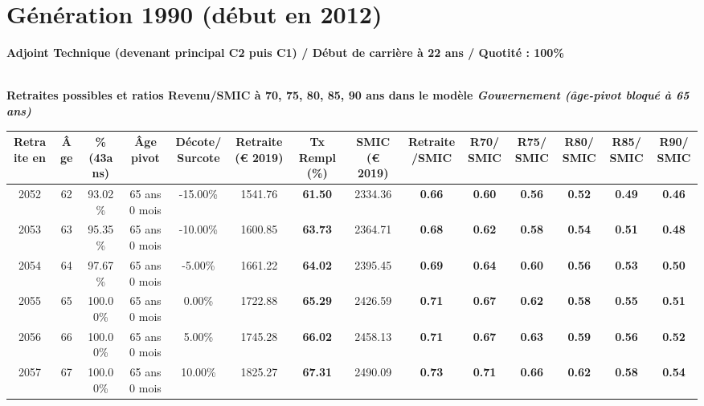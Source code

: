 \newpage 
 
\section{Génération 1990 (début en 2012)\label{AdjTech_100_22_1990_0}} 
 
{\bf \noindent Adjoint Technique (devenant principal C2 puis C1) / Début de carrière à 22 ans / Quotité : 100\%}  ~ 

 ~\\{\bf \noindent Retraites possibles et ratios Revenu/SMIC à 70, 75, 80, 85, 90 ans dans le modèle \emph{Gouvernement (âge-pivot bloqué à 65 ans)}}  
 
\begin{adjustbox}{max width=\textwidth} 
\begin{tabular}[htb]{|c|c||c|c|c||c|c||c|c||c|c|c|c|c|} 
\hline 
 Retraite en &  Âge &  \%(43ans) &  Âge pivot &  Décote/Surcote &  Retraite (\euro{} 2019) &  Tx Rempl(\%) &  SMIC (\euro{} 2019) &  Retraite/SMIC &  R70/SMIC &  R75/SMIC &  R80/SMIC &  R85/SMIC &  R90/SMIC \\ 
\hline \hline 
 2052 &  62 &  93.02\% &  65 ans 0 mois &  -15.00\% &  1541.76 &  {\bf 61.50} &  2334.36 &  {\bf {\color{red} 0.66}} &  {\bf {\color{red} 0.60}} &  {\bf {\color{red} 0.56}} &  {\bf {\color{red} 0.52}} &  {\bf {\color{red} 0.49}} &  {\bf {\color{red} 0.46}} \\ 
\hline 
 2053 &  63 &  95.35\% &  65 ans 0 mois &  -10.00\% &  1600.85 &  {\bf 63.73} &  2364.71 &  {\bf {\color{red} 0.68}} &  {\bf {\color{red} 0.62}} &  {\bf {\color{red} 0.58}} &  {\bf {\color{red} 0.54}} &  {\bf {\color{red} 0.51}} &  {\bf {\color{red} 0.48}} \\ 
\hline 
 2054 &  64 &  97.67\% &  65 ans 0 mois &  -5.00\% &  1661.22 &  {\bf 64.02} &  2395.45 &  {\bf {\color{red} 0.69}} &  {\bf {\color{red} 0.64}} &  {\bf {\color{red} 0.60}} &  {\bf {\color{red} 0.56}} &  {\bf {\color{red} 0.53}} &  {\bf {\color{red} 0.50}} \\ 
\hline 
 2055 &  65 &  100.00\% &  65 ans 0 mois &  0.00\% &  1722.88 &  {\bf 65.29} &  2426.59 &  {\bf {\color{red} 0.71}} &  {\bf {\color{red} 0.67}} &  {\bf {\color{red} 0.62}} &  {\bf {\color{red} 0.58}} &  {\bf {\color{red} 0.55}} &  {\bf {\color{red} 0.51}} \\ 
\hline 
 2056 &  66 &  100.00\% &  65 ans 0 mois &  5.00\% &  1745.28 &  {\bf 66.02} &  2458.13 &  {\bf {\color{red} 0.71}} &  {\bf {\color{red} 0.67}} &  {\bf {\color{red} 0.63}} &  {\bf {\color{red} 0.59}} &  {\bf {\color{red} 0.56}} &  {\bf {\color{red} 0.52}} \\ 
\hline 
 2057 &  67 &  100.00\% &  65 ans 0 mois &  10.00\% &  1825.27 &  {\bf 67.31} &  2490.09 &  {\bf {\color{red} 0.73}} &  {\bf {\color{red} 0.71}} &  {\bf {\color{red} 0.66}} &  {\bf {\color{red} 0.62}} &  {\bf {\color{red} 0.58}} &  {\bf {\color{red} 0.54}} \\ 
\hline 
\hline 
\end{tabular} 
\end{adjustbox} 
 
